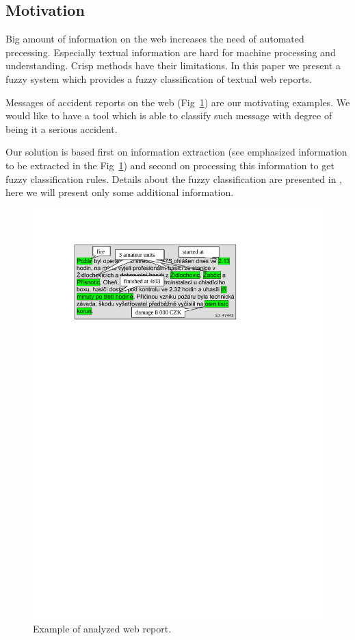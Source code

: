 \begin{multicols}{2}
\subsection{Motivation}
Big amount of information on the web increases the need of automated precessing. Especially textual information are hard for machine processing and understanding. Crisp methods have their limitations. In this paper we present a fuzzy system which provides a fuzzy classification of textual web reports. 

Messages of accident reports on the web (Fig~\ref{dedek:message}) are our motivating examples. We would like to have a tool which is able to classify such message with degree of being it a serious accident. 

Our solution is based first on information extraction (see emphasized information to be extracted in the Fig~\ref{dedek:message}) and second on processing this information to get fuzzy classification rules. Details about the fuzzy classification are presented in \cite{Dedek:FuzzWI}, here we will present only some additional information.

\begin{figure}
\medskip
\centerline{\includegraphics[width=\hsize]{img/message}}
\caption{Example of analyzed web report.}
\label{dedek:message}
\end{figure}



\end{multicols}
